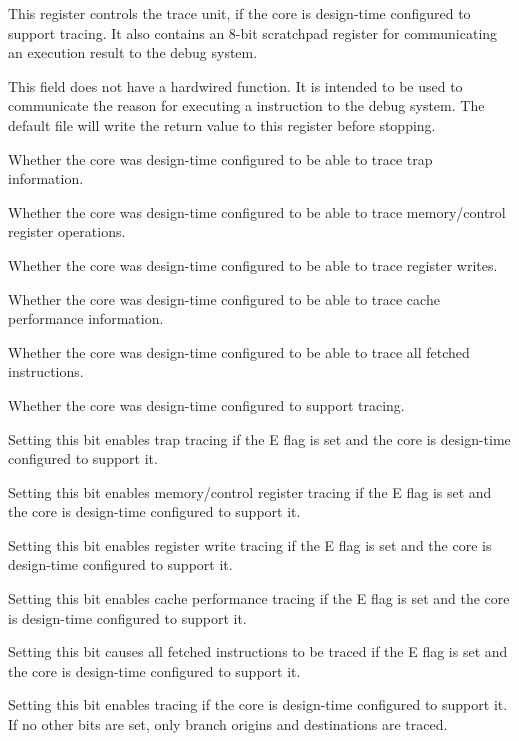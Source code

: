 This register controls the trace unit, if the core is design-time configured to
support tracing. It also contains an 8-bit scratchpad register for communicating
an execution result to the debug system.

\debugCanWrite{}
\coreCanWrite{}
\signed{}

This field does not have a hardwired function. It is intended to be used to
communicate the reason for executing a  instruction to the debug
system. The default  file will write the  return
value to this register before stopping.

\reset{*}

Whether the core was design-time configured to be able to trace trap
information.

\reset{*}

Whether the core was design-time configured to be able to trace memory/control
register operations.

\reset{*}

Whether the core was design-time configured to be able to trace register writes.

\reset{*}

Whether the core was design-time configured to be able to trace cache
performance information.

\reset{*}

Whether the core was design-time configured to be able to trace all fetched
instructions.

\reset{*}

Whether the core was design-time configured to support tracing.

\debugCanWrite{}

Setting this bit enables trap tracing if the E flag is set and the core is 
design-time configured to support it.

\debugCanWrite{}

Setting this bit enables memory/control register tracing if the E flag is set 
and the core is design-time configured to support it.

\debugCanWrite{}

Setting this bit enables register write tracing if the E flag is set and the 
core is design-time configured to support it.

\debugCanWrite{}

Setting this bit enables cache performance tracing if the E flag is set and the 
core is design-time configured to support it.

\debugCanWrite{}

Setting this bit causes all fetched instructions to be traced if the E flag is 
set and the core is design-time configured to support it.

\debugCanWrite{}

Setting this bit enables tracing if the core is design-time configured to 
support it. If no other bits are set, only branch origins and destinations are 
traced.

